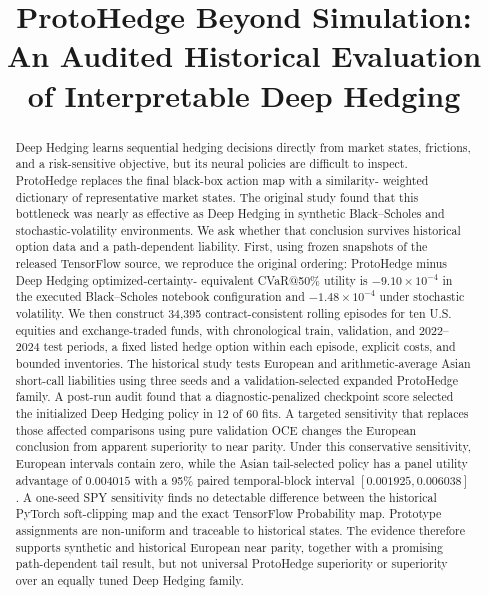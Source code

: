 \documentclass[conference]{IEEEtran}
\begin{document}
\title{ProtoHedge Beyond Simulation: An Audited Historical Evaluation of Interpretable Deep Hedging}

\author{
}

\maketitle

\begin{abstract}
Deep Hedging learns sequential hedging decisions directly from market states,
frictions, and a risk-sensitive objective, but its neural policies are difficult
to inspect. ProtoHedge replaces the final black-box action map with a similarity-
weighted dictionary of representative market states. The original study found
that this bottleneck was nearly as effective as Deep Hedging in synthetic
Black--Scholes and stochastic-volatility environments. We ask whether that
conclusion survives historical option data and a path-dependent liability.
First, using frozen snapshots of the released TensorFlow source, we reproduce
the original ordering: ProtoHedge minus Deep Hedging optimized-certainty-
equivalent CVaR@50\% utility is $-9.10\times10^{-4}$ in the executed
Black--Scholes notebook configuration and $-1.48\times10^{-4}$ under stochastic
volatility. We then construct 34,395 contract-consistent rolling episodes for
ten U.S. equities and exchange-traded funds, with chronological train,
validation, and 2022--2024 test periods, a fixed listed hedge option within
each episode, explicit costs, and bounded inventories. The historical study
tests European and arithmetic-average Asian short-call liabilities using three
seeds and a validation-selected expanded ProtoHedge family. A post-run audit
found that a diagnostic-penalized checkpoint score selected the initialized
Deep Hedging policy in 12 of 60 fits. A targeted sensitivity that replaces
those affected comparisons using pure validation OCE changes the European
conclusion from apparent superiority to near parity. Under this conservative
sensitivity, European intervals contain zero, while the Asian tail-selected
policy has a panel utility advantage of $0.004015$ with a 95\% paired
temporal-block interval $[0.001925,0.006038]$. A one-seed SPY sensitivity finds
no detectable difference between the historical PyTorch soft-clipping map and
the exact TensorFlow Probability map. Prototype assignments are non-uniform and
traceable to historical states. The evidence therefore supports synthetic and
historical European near parity, together with a promising path-dependent tail
result, but not universal ProtoHedge superiority or superiority over an equally
tuned Deep Hedging family.
\end{abstract}
\end{document}
